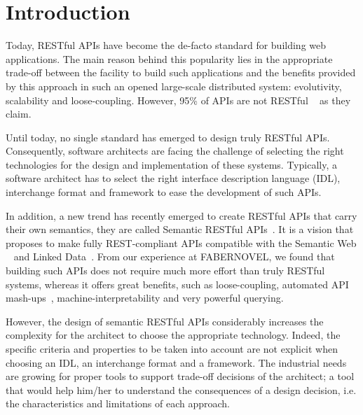 \section{Introduction}

\vspace*{-0.2cm}


Today, RESTful APIs \cite{FieldingThesis} have become the de-facto standard for building web applications. The main reason behind this popularity lies in the appropriate trade-off between the facility to build such applications and the benefits provided by this approach in such an opened large-scale distributed system: evolutivity, scalability and loose-coupling. However, 95\% of APIs are not RESTful ~\cite{10.1007/978-3-319-38791-8_2} as they claim.

Until today, no single standard has emerged to design truly RESTful APIs. Consequently, software architects are facing the challenge of selecting the right technologies for the design and implementation of these systems. Typically, a software architect has to select the right interface description language (IDL), interchange format and framework to ease the development of such APIs.

In addition, a new trend has recently emerged to create RESTful APIs that carry their own semantics, they are called Semantic RESTful APIs~\cite{7195633}. It is a vision that proposes to make fully REST-compliant APIs compatible with the Semantic Web ~\cite{TheSemanticWeb} and Linked Data~\cite{LinkedDataPrinciples}. From our experience at FABERNOVEL, we found that building such APIs does not require much more effort than truly RESTful systems, whereas it offers great benefits, such as loose-coupling, automated API mash-ups~\cite{benslimane2008services}, machine-interpretability and very powerful querying. 

However, the design of semantic RESTful APIs considerably increases the complexity for the architect to choose the appropriate technology. Indeed, the specific criteria and properties to be taken into account are not explicit when choosing an IDL, an interchange format and a framework.
The industrial needs are growing for proper tools to support trade-off decisions of the architect; a tool that would help him/her  to understand the consequences of a design decision, i.e. the characteristics and limitations of each approach. 

